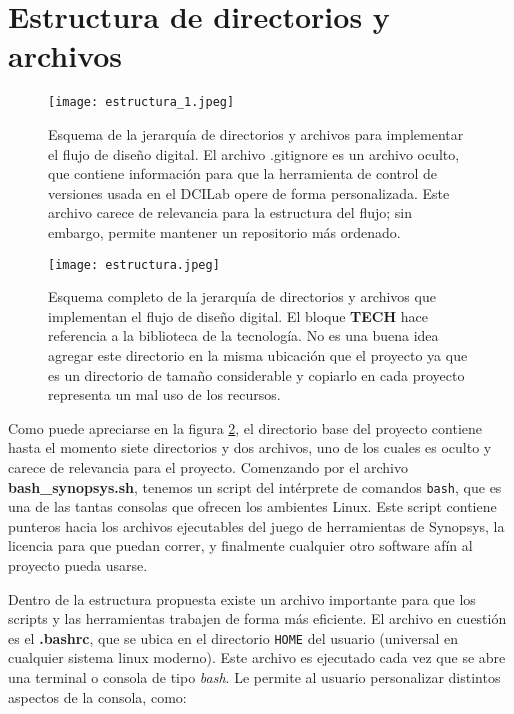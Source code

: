 \section{Estructura de directorios y archivos}

\begin{figure}[h]
\texttt{[image: estructura\_1.jpeg]}
\centering
\caption{Esquema de la jerarquía de directorios y archivos para implementar el flujo de diseño digital. El archivo .gitignore es un archivo oculto, que contiene información para que la herramienta de control de versiones usada en el DCILab opere de forma personalizada. Este archivo carece de relevancia para la estructura del flujo; sin embargo, permite mantener un repositorio más ordenado.}
\label{directorios}
\end{figure}


\begin{figure}[h]
\texttt{[image: estructura.jpeg]}
\centering
\caption{Esquema completo de la jerarquía de directorios y archivos que implementan el flujo de diseño digital. El bloque \textbf{TECH} hace referencia a la biblioteca de la tecnología. No es una buena idea agregar este directorio en la misma ubicación que el proyecto ya que es un directorio de tamaño considerable y copiarlo en cada proyecto representa un mal uso de los recursos.}
\label{directorios}
\end{figure}

Como puede apreciarse en la figura \ref{directorios}, el directorio base del proyecto contiene hasta el momento siete directorios y dos archivos, uno de los cuales es oculto y carece de relevancia para el proyecto. Comenzando por el archivo \textbf{bash\_synopsys.sh}, tenemos un script del intérprete de comandos \texttt{bash}, que es una de las tantas consolas que ofrecen los ambientes Linux. Este script contiene punteros hacia los archivos ejecutables del juego de herramientas de Synopsys, la licencia para que puedan correr, y finalmente cualquier otro software afín al proyecto pueda usarse.

Dentro de la estructura propuesta existe un archivo importante para que los scripts y las herramientas trabajen de forma más eficiente. El archivo en cuestión es el \textbf{.bashrc}, que se ubica en el directorio \texttt{HOME} del usuario (universal en cualquier sistema linux moderno). Este archivo es ejecutado cada vez que se abre una terminal o consola de tipo \textit{bash}. Le permite al usuario personalizar distintos aspectos de la consola, como:

